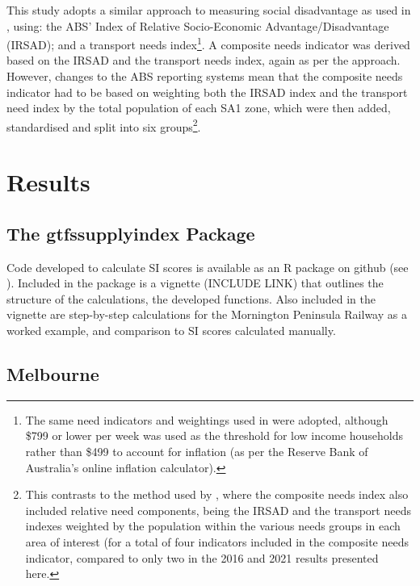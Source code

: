 \documentclass[preprint, 3p,
authoryear]{elsarticle} %
\begin{document}
This study adopts a similar approach to measuring social disadvantage as
used in \citet{currie2010identifying}, using: the ABS' Index of Relative
Socio-Economic Advantage/Disadvantage (IRSAD); and a transport needs
index\footnote{The same need indicators and weightings used in
  \citet{currie2010identifying} were adopted, although \$799 or lower
  per week was used as the threshold for low income households rather
  than \$499 to account for inflation (as per the Reserve Bank of
  Australia's online inflation calculator).}. A composite needs
indicator was derived based on the IRSAD and the transport needs index,
again as per the \citet{currie2010identifying} approach. However,
changes to the ABS reporting systems mean that the composite needs
indicator had to be based on weighting both the IRSAD index and the
transport need index by the total population of each SA1 zone, which
were then added, standardised and split into six groups\footnote{This
  contrasts to the method used by \citet{currie2010identifying}, where
  the composite needs index also included relative need components,
  being the IRSAD and the transport needs indexes weighted by the
  population within the various needs groups in each area of interest
  (for a total of four indicators included in the composite needs
  indicator, compared to only two in the 2016 and 2021 results presented
  here.}.

\hypertarget{results}{%
\section{Results}\label{results}}

\hypertarget{the-gtfssupplyindex-package}{%
\subsection{The gtfssupplyindex
Package}\label{the-gtfssupplyindex-package}}

Code developed to calculate SI scores is available as an R package on
github (see \citet{gtfssupplyindex_github}). Included in the package is
a vignette (INCLUDE LINK) that outlines the structure of the
calculations, the developed functions. Also included in the vignette are
step-by-step calculations for the Mornington Peninsula Railway as a
worked example, and comparison to SI scores calculated manually.

\hypertarget{melbourne}{%
\subsection{Melbourne}\label{melbourne}}
\end{document}
